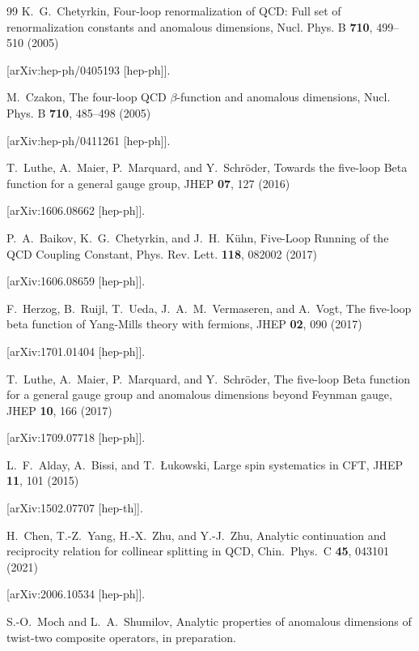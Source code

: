 \documentclass[
 twocolumn,
 superscriptaddress,
 preprintnumbers,
 nofootinbib,
 amsmath,amssymb,
 aps,
 prl
 ]{revtex4-2}
\begin{document}
\begin{thebibliography}{99}
K.~G.~Chetyrkin,
Four-loop renormalization of QCD: Full set of renormalization constants and anomalous dimensions,
Nucl. Phys. B \textbf{710}, 499--510 (2005)

[arXiv:hep-ph/0405193 [hep-ph]].



M.~Czakon,
The four-loop QCD $\beta$-function and anomalous dimensions,
Nucl. Phys. B \textbf{710}, 485--498 (2005)

[arXiv:hep-ph/0411261 [hep-ph]].



T.~Luthe, A.~Maier, P.~Marquard, and Y.~Schr{\"o}der,
Towards the five-loop Beta function for a general gauge group,
JHEP \textbf{07}, 127 (2016)

[arXiv:1606.08662 [hep-ph]].



P.~A.~Baikov, K.~G.~Chetyrkin, and J.~H.~K{\"u}hn,
Five-Loop Running of the QCD Coupling Constant,
Phys. Rev. Lett. \textbf{118}, 082002 (2017)

[arXiv:1606.08659 [hep-ph]].



F.~Herzog, B.~Ruijl, T.~Ueda, J.~A.~M.~Vermaseren, and A.~Vogt,
The five-loop beta function of Yang-Mills theory with fermions,
JHEP \textbf{02}, 090 (2017)

[arXiv:1701.01404 [hep-ph]].



T.~Luthe, A.~Maier, P.~Marquard, and Y.~Schr{\"o}der,
The five-loop Beta function for a general gauge group and anomalous dimensions beyond Feynman gauge,
JHEP \textbf{10}, 166 (2017)

[arXiv:1709.07718 [hep-ph]].


L.~F.~Alday, A.~Bissi, and T.~{\L}ukowski,
Large spin systematics in CFT,
JHEP \textbf{11}, 101 (2015)

[arXiv:1502.07707 [hep-th]].


H.~Chen, T.-Z.~Yang, H.-X.~Zhu, and Y.-J.~Zhu,
Analytic continuation and reciprocity relation for collinear splitting in QCD,
Chin.\ Phys.\ C \textbf{45}, 043101 (2021)

[arXiv:2006.10534 [hep-ph]].


S.-O.~Moch and L.~A.~Shumilov,
Analytic properties of anomalous dimensions of twist-two composite operators,
in preparation.



\end{thebibliography}
\end{document}
